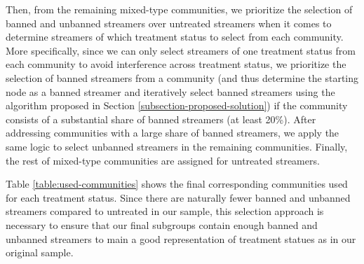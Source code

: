 \documentclass[a4paper,12pt]{article}
\begin{document}
Then, from the remaining mixed-type communities, we prioritize the selection of banned and unbanned streamers over untreated streamers when it comes to determine streamers of which treatment status to select from each community. More specifically, since we can only select streamers of one treatment status from each community to avoid interference across treatment status, we prioritize the selection of banned streamers from a community (and thus determine the starting node as a banned streamer and iteratively select banned streamers using the algorithm proposed in Section \ref{subsection-proposed-solution}) if the community consists of a substantial share of banned streamers (at least 20\%). After addressing communities with a large share of banned streamers, we apply the same logic to select unbanned streamers in the remaining communities. Finally, the rest of mixed-type communities are assigned for untreated streamers. 

Table \ref{table:used-communities} shows the final corresponding communities used for each treatment status. Since there are naturally fewer banned and unbanned streamers compared to untreated in our sample, this selection approach is necessary to ensure that our final subgroups contain enough banned and unbanned streamers to main a good representation of treatment statues as in our original sample. 






\clearpage
\end{document}
